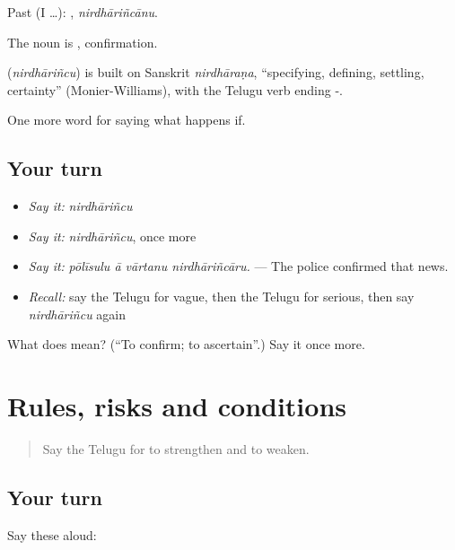 Past (I …): , \emph{nirdhāriñcānu}.

The noun is , confirmation.

\begin{cousinweb}
\textbf{} (\emph{nirdhāriñcu}) is built on Sanskrit \emph{nirdhāraṇa}, \textquotedblleft{}specifying, defining, settling, certainty\textquotedblright{} (Monier-Williams), with the Telugu verb ending -.
\end{cousinweb}

\begin{grammarlens}[title={What you've built}]
One more word for saying what happens if.
\end{grammarlens}

\subsection*{Your turn}
\begin{itemize}
\raggedright
  \item \emph{Say it:} \emph{nirdhāriñcu}
  \item \emph{Say it:} \emph{nirdhāriñcu}, once more
  \item \emph{Say it:} \emph{pōlīsulu ā vārtanu nirdhāriñcāru.} — The police confirmed that news.
  \item \emph{Recall:} say the Telugu for vague, then the Telugu for serious, then say \emph{nirdhāriñcu} again
\end{itemize}

\begin{tcolorbox}[breakable,colback=teal!4,colframe=teal!35!black,title={Before you move on}]
What does  mean? (\textquotedblleft{}To confirm; to ascertain\textquotedblright{}.) Say it once more.
\end{tcolorbox}
\section[(dialogue)]{Rules, risks and conditions}

\label{lesson:TE-R437-review-430-437}



\begin{quote}
Say the Telugu for to strengthen and to weaken.
\end{quote}

\subsection*{Your turn}
Say these aloud:

